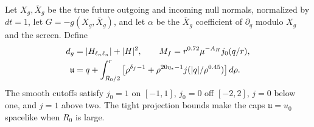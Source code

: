 Let $X_g,\bar X_g$ be the true future outgoing and incoming null normals,
normalized by $dt=1$, let $G=-g(X_g,\bar X_g)$, and let $\alpha$ be the
$\bar X_g$ coefficient of $\partial_q$ modulo $X_g$ and the screen.
Define
\begin{align}
 d_g&=|H_{\ell_n\ell_n}|+|H|^2,\qquad
 M_f=r^{0.72}\mu^{-A_H}j_0(q/r),\notag\\
 \mathfrak u&=q+\int_{R_0/2}^r
       \left[\rho^{\delta_f-1}
         +\rho^{20\eta_*-1}j(|q|/\rho^{0.45})\right]d\rho.
                                                        \label{far:caps}
\end{align}
The smooth cutoffs satisfy $j_0=1$ on $[-1,1]$, $j_0=0$ off $[-2,2]$,
$j=0$ below one, and $j=1$ above two.  The tight projection bounds make
the caps $\mathfrak u=u_0$ spacelike when $R_0$ is large.


